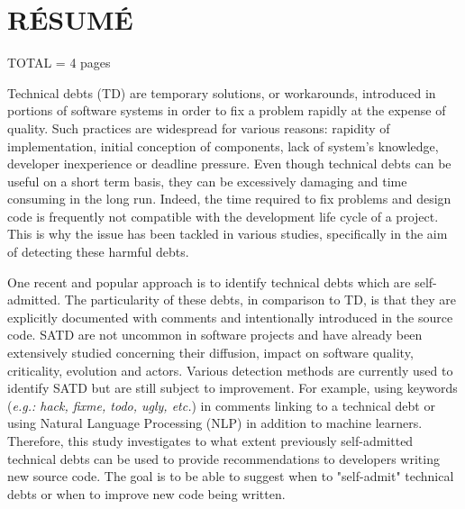 %
%

\chapter*{RÉSUMÉ}\thispagestyle{headings}

TOTAL = 4 pages

\setlength{\parindent}{5ex} Technical debts (TD) are temporary solutions, or workarounds, introduced in portions of software systems in order to fix a problem rapidly at the expense of quality. Such practices are widespread for various reasons: rapidity of implementation, initial conception of components, lack of system's knowledge, developer inexperience or deadline pressure. Even though technical debts can be useful on a short term basis, they can be excessively damaging and time consuming in the long run. Indeed, the time required to fix problems and design code is frequently not compatible with the development life cycle of a project. This is why the issue has been tackled in various studies, specifically in the aim of detecting these harmful debts.

\setlength{\parindent}{5ex} One recent and popular approach is to identify technical debts which are self-admitted. The particularity of these debts, in comparison to TD, is that they are explicitly documented with comments and intentionally introduced in the source code. SATD are not uncommon in software projects and have already been extensively studied concerning their diffusion, impact on software quality, criticality, evolution and actors. Various detection methods are currently used to identify SATD but are still subject to improvement. For example, using keywords (\emph{e.g.: hack, fixme, todo, ugly, etc.}) in comments linking to a technical debt or using Natural Language Processing (NLP) in addition to machine learners. Therefore, this study investigates to what extent previously self-admitted technical debts can be used to provide recommendations to developers writing new source code. The goal is to be able to suggest when to "self-admit" technical debts or when to improve new code being written.

